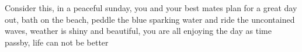 Consider this, in a peaceful sunday, you and your best mates plan for a great day out, bath on the beach, peddle the blue sparking water and ride the uncontained waves, weather is shiny and beautiful, you are all enjoying the day as time passby, life can not be better